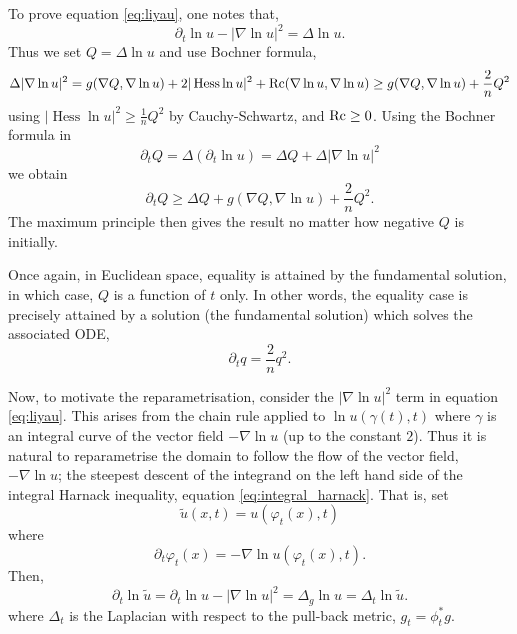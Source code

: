 To prove equation \eqref{eq:liyau}, one notes that,
\begin{equation}
\label{eq:evolution_lnu}
\partial_t \ln u - |\nabla \ln u|^2 = \Delta \ln u.
\end{equation}
Thus we set $Q = \Delta \ln u$ and use Bochner formula,
\[
\Delta |\nabla \ln u|^2 = g(\nabla Q, \nabla \ln u) + 2 |\operatorname{Hess} \ln u|^2 + \operatorname{Rc}(\nabla \ln u, \nabla \ln u) \geq g(\nabla Q, \nabla \ln u) + \frac{2}{n} Q^2
\]
using $|\operatorname{Hess} \ln u|^2 \geq \tfrac{1}{n} Q^2$ by Cauchy-Schwartz, and $\operatorname{Rc} \geq 0$. Using the Bochner formula in
\[
\partial_t Q = \Delta (\partial_t \ln u) = \Delta Q + \Delta |\nabla \ln u|^2
\]
we obtain
\begin{equation}
\label{eq:liyau_harnack_differential}
\partial_t Q \geq \Delta Q + g(\nabla Q, \nabla \ln u) + \frac{2}{n} Q^2.
\end{equation}
The maximum principle then gives the result no matter how negative $Q$ is initially.

Once again, in Euclidean space, equality is attained by the fundamental solution, in which case, $Q$ is a function of $t$ only. In other words, the equality case is precisely attained by a solution (the fundamental solution) which solves the associated ODE,
\[
\partial_t q = \frac{2}{n} q^2.
\]

Now, to motivate the reparametrisation, consider the $|\nabla \ln u|^2$ term in equation \eqref{eq:liyau}. This arises from the chain rule applied to $\ln u(\gamma(t), t)$ where $\gamma$ is an integral curve of the vector field $-\nabla \ln u$ (up to the constant $2$). Thus it is natural to reparametrise the domain to follow the flow of the vector field, $-\nabla \ln u$; the steepest descent of the integrand on the left hand side of the integral Harnack inequality,  equation \eqref{eq:integral_harnack}. That is, set
\[
\tilde{u} (x, t) = u(\varphi_t(x), t)
\]
where
\[
\partial_t \varphi_t (x) = -\nabla \ln u (\varphi_t(x), t).
\]
Then,
\[
\partial_t \ln \tilde{u} = \partial_t \ln u - |\nabla \ln u|^2 = \Delta_g \ln u = \Delta_t \ln \tilde{u}.
\]
where $\Delta_t$ is the Laplacian with respect to the pull-back metric, $g_t = \phi_t^{\ast} g$.

